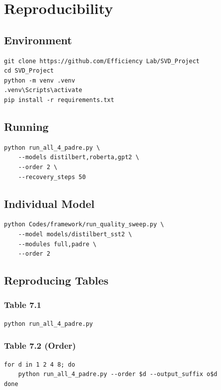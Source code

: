 \section{Reproducibility}

\subsection{Environment}

\begin{lstlisting}
git clone https://github.com/Efficiency Lab/SVD_Project
cd SVD_Project
python -m venv .venv
.venv\Scripts\activate
pip install -r requirements.txt
\end{lstlisting}

\subsection{Running}

\begin{lstlisting}
python run_all_4_padre.py \
    --models distilbert,roberta,gpt2 \
    --order 2 \
    --recovery_steps 50
\end{lstlisting}

\subsection{Individual Model}

\begin{lstlisting}
python Codes/framework/run_quality_sweep.py \
    --model models/distilbert_sst2 \
    --modules full,padre \
    --order 2
\end{lstlisting}

\subsection{Reproducing Tables}

\subsubsection{Table 7.1}
\begin{lstlisting}
python run_all_4_padre.py
\end{lstlisting}

\subsubsection{Table 7.2 (Order)}
\begin{lstlisting}
for d in 1 2 4 8; do
    python run_all_4_padre.py --order $d --output_suffix o$d
done
\end{lstlisting}

